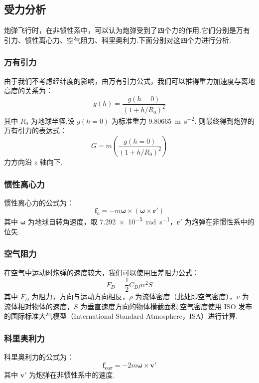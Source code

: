 \documentclass[UTF8]{ctexart}
\renewcommand{\vec}[1]{\boldsymbol{#1}} %
\begin{document}
		\subsection{受力分析}
		炮弹飞行时，在非惯性系中，可以认为炮弹受到了四个力的作用.它们分别是万有引力、惯性离心力、空气阻力、科里奥利力.下面分别对这四个力进行分析.
			\subsubsection{万有引力}
			由于我们不考虑经纬度的影响，由万有引力公式，我们可以推得重力加速度与离地高度的关系为：
			$$ g(h) = \frac{g(h = 0)}{(1 + h/R_0)^2} $$
			其中 $R_0$ 为地球半径.设 $g(h=0)$ 为标准重力 \SI[per-mode=fraction,fraction-function=\sfrac]{9.80665}{\metre\per\square\second}.
			则最终得到炮弹的万有引力的表达式：
			$$ G=m(\frac{g(h = 0)}{(1 + h/R_0)^2}) $$
			力方向沿 $z$ 轴向下.
			\subsubsection{惯性离心力}
			惯性离心力的公式为：
			$$ \vec{f_c} = -m\vec{\omega} \times (\vec{\omega} \times \vec{r}') $$
			其中 $\vec{\omega}$ 为地球自转角速度，取 \SI[per-mode=fraction,fraction-function=\sfrac]{7.292e-5}{\radian\per\second}，$\vec{r}'$ 为炮弹在非惯性系中的位矢.
			\subsubsection{空气阻力}
			在空气中运动时炮弹的速度较大，我们可以使用压差阻力公式：
			$$F_D=\frac{1}{2}C_D\rho v^2S$$
			其中 $F_D$ 为阻力，方向与运动方向相反，$\rho$ 为流体密度（此处即空气密度），$v$ 为流体相对物体的速度，$S$ 为垂直速度方向的物体横截面积.空气密度使用 ISO 发布的国际标准大气模型（International Standard Atmosphere，ISA）进行计算.
			\subsubsection{科里奥利力}
			科里奥利力的公式为：
			$$\vec{f_{cor}}=-2m\vec{\omega}\times \vec{v}'$$
			其中 $\vec{v}'$ 为炮弹在非惯性系中的速度.
\end{document}
